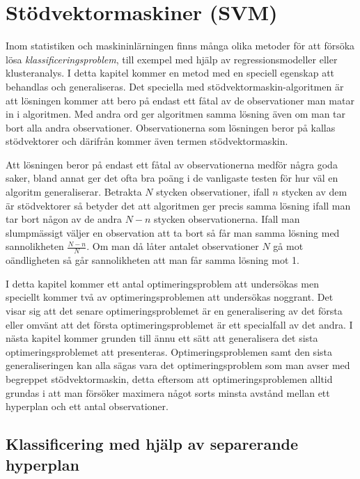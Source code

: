 \documentclass[a4paper, 12pt]{report}
\theoremstyle{definition}
\theoremstyle{remark}
\begin{document}

\chapter{Stödvektormaskiner (SVM)}

Inom statistiken och maskininlärningen finns många olika metoder för att försöka lösa \emph{klassificeringsproblem}, till exempel med hjälp av regressionsmodeller eller klusteranalys. I detta kapitel kommer en metod med en speciell egenskap att behandlas och generaliseras. Det speciella med stödvektormaskin-algoritmen är att lösningen kommer att bero på endast ett fåtal av de observationer man matar in i algoritmen. Med andra ord ger algoritmen samma lösning även om man tar bort alla andra observationer. Observationerna som lösningen beror på kallas stödvektorer och därifrån kommer även termen stödvektormaskin.

Att lösningen beror på endast ett fåtal av observationerna medför några goda saker, bland annat ger det ofta bra poäng i de vanligaste testen för hur väl en algoritm generaliserar. Betrakta $N$ stycken observationer, ifall $n$ stycken av dem är stödvektorer så betyder det att algoritmen ger precis samma lösning ifall man tar bort någon av de andra $N-n$ stycken observationerna. Ifall man slumpmässigt väljer en observation att ta bort så får man samma lösning med sannolikheten $\frac{N-n}{N}$. Om man då låter antalet observationer $N$ gå mot oändligheten så går sannolikheten att man får samma lösning mot 1.

I detta kapitel kommer ett antal optimeringsproblem att undersökas men speciellt kommer två av optimeringsproblemen att undersökas noggrant. Det visar sig att det senare optimeringsproblemet är en generalisering av det första eller omvänt att det första optimeringsproblemet är ett specialfall av det andra. I nästa kapitel kommer grunden till ännu ett sätt att generalisera det sista optimeringsproblemet att presenteras. Optimeringsproblemen samt den sista generaliseringen kan alla sägas vara det optimeringsproblem som man avser med begreppet stödvektormaskin, detta eftersom att optimeringsproblemen alltid grundas i att man försöker maximera något sorts minsta avstånd mellan ett hyperplan och ett antal observationer.

\section{Klassificering med hjälp av separerande hyperplan}
\end{document}
